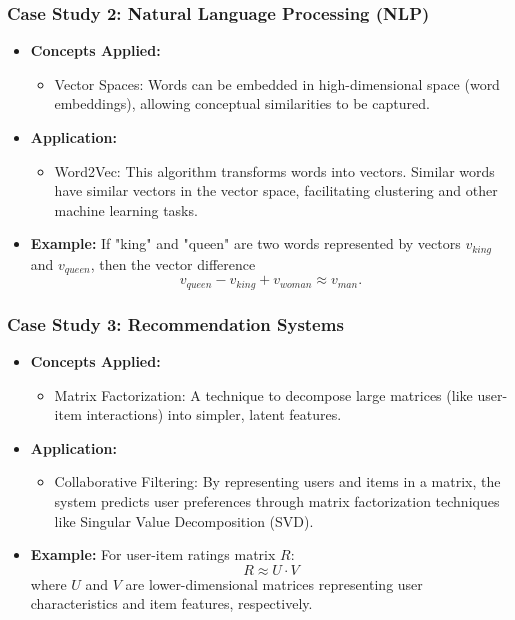 \documentclass{beamer}
\begin{document}
\begin{frame}[fragile]
    \frametitle{Case Study 2: Natural Language Processing (NLP)}
    \begin{itemize}
        \item \textbf{Concepts Applied:}
            \begin{itemize}
                \item Vector Spaces: Words can be embedded in high-dimensional space (word embeddings), allowing conceptual similarities to be captured.
            \end{itemize}

        \item \textbf{Application:}
            \begin{itemize}
                \item Word2Vec: This algorithm transforms words into vectors. Similar words have similar vectors in the vector space, facilitating clustering and other machine learning tasks.
            \end{itemize}

        \item \textbf{Example:}
            If "king" and "queen" are two words represented by vectors \( v_{king} \) and \( v_{queen} \), then the vector difference 
            \[
            v_{queen} - v_{king} + v_{woman} \approx v_{man}.
            \]
    \end{itemize}
\end{frame}

\begin{frame}[fragile]
    \frametitle{Case Study 3: Recommendation Systems}
    \begin{itemize}
        \item \textbf{Concepts Applied:}
            \begin{itemize}
                \item Matrix Factorization: A technique to decompose large matrices (like user-item interactions) into simpler, latent features.
            \end{itemize}

        \item \textbf{Application:}
            \begin{itemize}
                \item Collaborative Filtering: By representing users and items in a matrix, the system predicts user preferences through matrix factorization techniques like Singular Value Decomposition (SVD).
            \end{itemize}

        \item \textbf{Example:}
            For user-item ratings matrix \( R \):
            \begin{equation}
            R \approx U \cdot V
            \end{equation}
            where \( U \) and \( V \) are lower-dimensional matrices representing user characteristics and item features, respectively.
    \end{itemize}
\end{frame}
\end{document}
